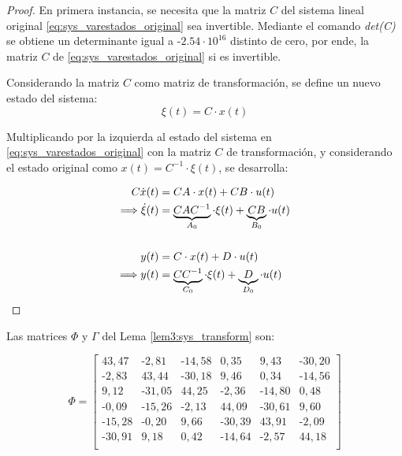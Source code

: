 \begin{proof}

En primera instancia, se necesita que la matriz $C$ del sistema lineal original \ref{eq:sys_varestados_original} sea invertible. Mediante el comando \textit{det(C)} se obtiene un determinante igual a $\textrm{-}2.54\cdot10^{16}$ distinto de cero, por ende, la matriz $C$ de \ref{eq:sys_varestados_original} si es invertible.

Considerando la matriz $C$ como matriz de transformación, se define un nuevo estado del sistema:
\begin{equation}
    \xi(t) = C \cdot x(t)
\end{equation}

Multiplicando por la izquierda al estado del sistema en \ref{eq:sys_varestados_original} con la matriz $C$ de transformación, y considerando el estado original como $x(t)=C^{-1}\cdot \xi(t)$, se desarrolla:

\begin{subequations}
\begin{align}
    C \dot{x}(t) & = CA \cdot x(t) + CB \cdot u(t) \notag \\   
    \Longrightarrow \dot{\xi}(t) & = \underbrace{CAC^{-1}}_{A_0} \cdot \xi(t) + \underbrace{CB}_{B_0} \cdot u(t) \\
    \notag \\
    y(t) & = C \cdot x(t) + D \cdot u(t) \notag \\
    \Longrightarrow y(t) & = \underbrace{CC^{-1}}_{C_0} \cdot \xi(t) + \underbrace{D}_{D_0} \cdot u(t)
\end{align}
\end{subequations}

\end{proof}

Las matrices $\Phi$ y $\Gamma$ del Lema \ref{lem3:sys_transform} son:
        
\begin{equation}    
\Phi = \begin{bmatrix}
    43,47 & \textrm{-}2,81 & \textrm{-}14,58 & 0,35 & 9,43 & \textrm{-}30,20 \\
    \textrm{-}2,83 &	43,44 &	\textrm{-}30,18 & 9,46 &	0,34 &	\textrm{-}14,56 \\
    9,12 & \textrm{-}31,05 &	44,25 &	\textrm{-}2,36 &	\textrm{-}14,80 & 0,48 \\
    \textrm{-}0,09 &	\textrm{-}15,26 & \textrm{-}2,13 & 44,09 & \textrm{-}30,61 & 9,60 \\
    \textrm{-}15,28 & \textrm{-}0,20 & 9,66 &	\textrm{-}30,39 & 43,91 & \textrm{-}2,09 \\
    \textrm{-}30,91 & 9,18 &	0,42 & \textrm{-}14,64 &	\textrm{-}2,57 & 44,18 \\
\end{bmatrix}
\end{equation}

